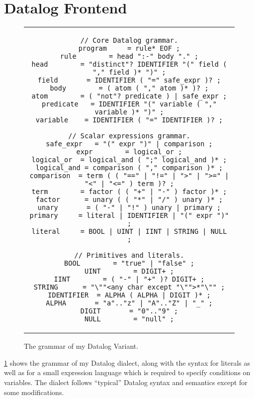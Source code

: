 \section{Datalog Frontend}\label{sec:datalog-frontend}

\begin{figure}[htpb]
    \centering
    \begin{tabular}{c}
        \begin{lstlisting}[keepspaces]
// Core Datalog grammar.
program     = rule* EOF ;
rule        = head ":-" body "." ;
head        = "distinct"? IDENTIFIER "(" field ( "," field )* ")" ;
field       = IDENTIFIER ( "=" safe_expr )? ;
body        = ( atom ( "," atom )* )? ;
atom        = ( "not"? predicate ) | safe_expr ;
predicate   = IDENTIFIER "(" variable ( "," variable )* ")" ;
variable    = IDENTIFIER ( "=" IDENTIFIER )? ;

// Scalar expressions grammar.
safe_expr   = "(" expr ")" | comparison ;
expr        = logical_or ;
logical_or  = logical_and ( ";" logical_and )* ;
logical_and = comparison ( "," comparison )* ;
comparison  = term ( ( "==" | "!=" | ">" | ">=" | "<" | "<=" ) term )? ;
term        = factor ( ( "+" | "-" ) factor )* ;
factor      = unary ( ( "*" | "/" ) unary )* ;
unary       = ( "-" | "!" ) unary | primary ;
primary     = literal | IDENTIFIER | "(" expr ")" ;
literal     = BOOL | UINT | IINT | STRING | NULL ;

// Primitives and literals.
BOOL        = "true" | "false" ;
UINT        = DIGIT+ ;
IINT        = ( "-" | "+" )? DIGIT+ ;
STRING      = "\""<any char except "\"">*"\"" ;
IDENTIFIER  = ALPHA ( ALPHA | DIGIT )* ;
ALPHA       = "a".."z" | "A".."Z" | "_" ;
DIGIT       = "0".."9" ;
NULL        = "null" ;\end{lstlisting}
    \end{tabular}
    \caption{The grammar of my Datalog Variant.}\label{code:datalog-grammar}
\end{figure}

\ref{code:datalog-grammar} shows the grammar of my Datalog dialect\footnotemark{},
along with the syntax for literals as well as for a small expression language
which is required to specify conditions on variables.
The dialect follows ``typical'' Datalog syntax and semantics
except for some modifications.


